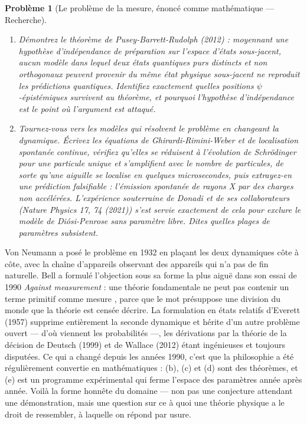 \documentclass[11pt]{article}
\newtheorem{problem}{Problème}
\begin{document}
\begin{problem}[{Le problème de la mesure, énoncé comme mathématique --- Recherche}]
\begin{enumerate}
que chacune abandonne.
\item[(d)] Démontrez le théorème de Pusey-Barrett-Rudolph (2012) : moyennant une hypothèse d'indépendance
de préparation sur l'espace d'états sous-jacent, aucun modèle dans lequel deux états quantiques
purs distincts et non orthogonaux peuvent provenir du même état physique sous-jacent ne reproduit
les prédictions quantiques. Identifiez exactement quelles positions \og{} $\psi$-épistémiques \fg{}
survivent au théorème, et pourquoi l'hypothèse d'indépendance est le point où l'argument est
attaqué.
\item[(e)] Tournez-vous vers les modèles qui résolvent le problème en changeant la dynamique. Écrivez les
équations de Ghirardi-Rimini-Weber et de localisation spontanée continue, vérifiez qu'elles se
réduisent à l'évolution de Schrödinger pour une particule unique et s'amplifient avec le nombre de
particules, de sorte qu'une aiguille se localise en quelques microsecondes, puis extrayez-en une
prédiction falsifiable : l'émission spontanée de rayons X par des charges non accélérées.
L'expérience souterraine de Donadi et de ses collaborateurs (\textit{Nature Physics} 17, 74 (2021))
s'est servie exactement de cela pour exclure le modèle de Diósi-Penrose sans paramètre libre.
Dites quelles plages de paramètres subsistent.
\end{enumerate}

\end{problem}

\noindent Von Neumann a posé le problème en 1932 en plaçant les deux dynamiques côte à
côte, avec la \og{} chaîne \fg{} d'appareils observant des appareils qui n'a pas de fin naturelle. Bell a
formulé l'objection sous sa forme la plus aiguë dans son essai de 1990 \textit{Against
\og{} measurement \fg{}} : une théorie fondamentale ne peut pas contenir un terme primitif comme
\og{} mesure \fg{}, parce que le mot présuppose une division du monde que la théorie est censée décrire.
La formulation en états relatifs d'Everett (1957) supprime entièrement la seconde dynamique et
hérite d'un autre problème ouvert --- d'où viennent les probabilités ---, les dérivations par la
théorie de la décision de Deutsch (1999) et de Wallace (2012) étant ingénieuses et toujours
disputées. Ce qui a changé depuis les années 1990, c'est que la philosophie a été régulièrement
convertie en mathématiques : (b), (c) et (d) sont des théorèmes, et (e) est un programme
expérimental qui ferme l'espace des paramètres année après année. Voilà la forme honnête du
domaine --- non pas une conjecture attendant une démonstration, mais une question sur ce à quoi une
théorie physique a le droit de ressembler, à laquelle on répond par usure.
\end{document}
